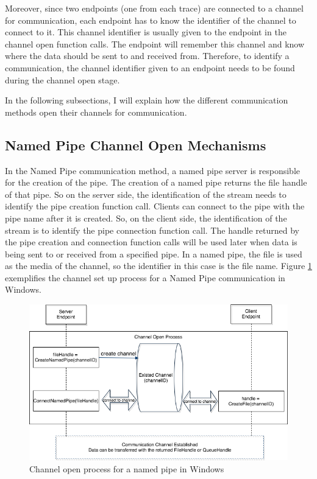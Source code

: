 Moreover, since two endpoints (one from each trace) are connected to a channel for communication, each endpoint has to know the identifier of the channel to connect to it. This channel identifier is usually given to the endpoint in the channel open function calls. The endpoint will remember this channel and know where the data should be sent to and received from. Therefore, to identify a communication, the channel identifier given to an endpoint needs to be found during the channel open stage.

In the following subsections, I will explain how the different communication methods open their channels for communication.

\subsection{Named Pipe Channel Open Mechanisms} 
In the Named Pipe communication method, a named pipe server is responsible for the creation of the pipe. The creation of a named pipe returns the file handle of that pipe. So on the server side, the identification of the stream needs to identify the pipe creation function call. Clients can connect to the pipe with the pipe name after it is created. So, on the client side, the identification of the stream is to identify the pipe connection function call. The handle returned by the pipe creation and connection function calls will be used later when data is being sent to or received from a specified pipe. In a named pipe, the file is used as the media of the channel, so the identifier in this case is the file name. \cite{WinNamedpipe} Figure \ref{namedpipeopen} exemplifies the channel set up process for a Named Pipe communication in Windows. 

\begin{figure}[H]
\centerline{\includegraphics[scale=0.5]{Figures/namepipechannelopen}}
 \caption{Channel open process for a named pipe in Windows}
\label{namedpipeopen}
\end{figure}
    
